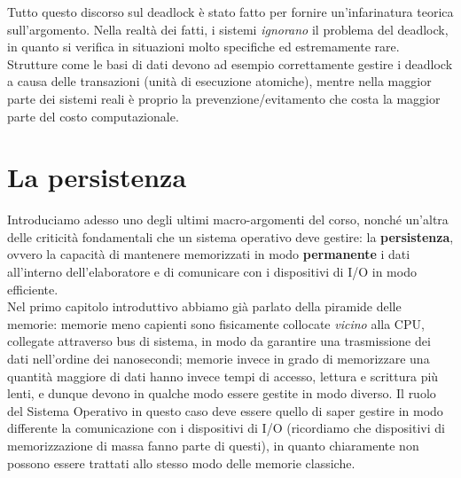 \documentclass[12pt]{report}
\begin{document}
	Tutto questo discorso sul deadlock è stato fatto per fornire un'infarinatura teorica sull'argomento. Nella realtà dei fatti, i sistemi \textit{ignorano} il problema del deadlock, in quanto si verifica in situazioni molto specifiche ed estremamente rare. Strutture come le basi di dati devono ad esempio correttamente gestire i deadlock a causa delle transazioni (unità di esecuzione atomiche), mentre nella maggior parte dei sistemi reali è proprio la prevenzione/evitamento che costa la maggior parte del costo computazionale.
	
	\chapter{La persistenza}
	Introduciamo adesso uno degli ultimi macro-argomenti del corso, nonché un'altra delle criticità fondamentali che un sistema operativo deve gestire: la \textbf{persistenza}, ovvero la capacità di mantenere memorizzati in modo \textbf{permanente} i dati all'interno dell'elaboratore e di comunicare con i dispositivi di I/O in modo efficiente.\\
	Nel primo capitolo introduttivo abbiamo già parlato della piramide delle memorie: memorie meno capienti sono fisicamente collocate \textit{vicino} alla CPU, collegate attraverso bus di sistema, in modo da garantire una trasmissione dei dati nell'ordine dei nanosecondi; memorie invece in grado di memorizzare una quantità maggiore di dati hanno invece tempi di accesso, lettura e scrittura più lenti, e dunque devono in qualche modo essere gestite in modo diverso. Il ruolo del Sistema Operativo in questo caso deve essere quello di saper gestire in modo differente la comunicazione con i dispositivi di I/O (ricordiamo che dispositivi di memorizzazione di massa fanno parte di questi), in quanto chiaramente non possono essere trattati allo stesso modo delle memorie classiche.
\end{document}
